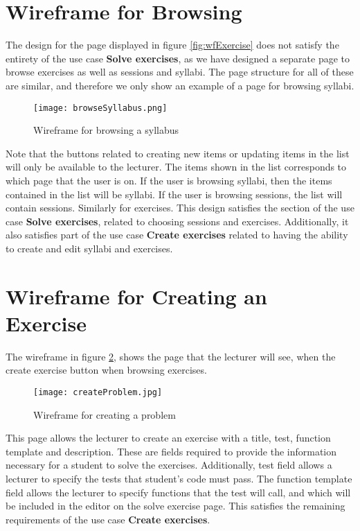 \section{Wireframe for Browsing}
The design for the page displayed in figure \ref{fig:wfExercise} does not satisfy the entirety of the use case \textbf{Solve exercises}, as we have designed a separate page to browse exercises as well as sessions and syllabi. The page structure for all of these are similar, and therefore we only show an example of a page for browsing syllabi.
\begin{figure}[H]
    \texttt{[image: browseSyllabus.png]}
    \centering
    \caption{Wireframe for browsing a syllabus}
    \label{fig:wfSyllabus}
\end{figure}
Note that the buttons related to creating new items or updating items in the list will only be available to the lecturer. The items shown in the list corresponds to which page that the user is on. If the user is browsing syllabi, then the items contained in the list will be syllabi. If the user is browsing sessions, the list will contain sessions. Similarly for exercises. This design satisfies the section of the use case \textbf{Solve exercises}, related to choosing sessions and exercises. Additionally, it also satisfies part of the use case \textbf{Create exercises} related to having the ability to create and edit syllabi and exercises.

\section{Wireframe for Creating an Exercise}
The wireframe in figure \ref{fig:wfProblem}, shows the page that the lecturer will see, when the create exercise button when browsing exercises.
\begin{figure}[H]
	\texttt{[image: createProblem.jpg]}
	\centering
	\caption{Wireframe for creating a problem}
	\label{fig:wfProblem}
\end{figure}

This page allows the lecturer to create an exercise with a title, test, function template and description. These are fields required to provide the information necessary for a student to solve the exercises. Additionally, test field allows a lecturer to specify the tests that student's code must pass. The function template field allows the lecturer to specify functions that the test will call, and which will be included in the editor on the solve exercise page. This satisfies the remaining requirements of the use case \textbf{Create exercises}.